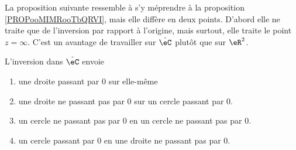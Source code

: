 La proposition suivante ressemble à s'y méprendre à la proposition \ref{PROPooMIMRooTbQRVI}, mais elle diffère en deux points. D'abord elle ne traite que de l'inversion par rapport à l'origine, mais surtout, elle traite le point \( z=\infty\). C'est un avantage de travailler sur \( \hat \eC\) plutôt que sur \( \eR^2\).
\begin{proposition}     \label{PROPooEAKXooUIqWEv}
    L'inversion dans \( \hat \eC\) envoie
    \begin{enumerate}
        \item
            une droite passant par \( 0\) sur elle-même
        \item
            une droite ne passant pas par \( 0\) sur un cercle passant par \( 0\).
        \item
            un cercle ne passant pas par \( 0\) en un cercle ne passant pas par \( 0\).
        \item
            un cercle passant par \( 0\) en une droite ne passant pas par \( 0\).
    \end{enumerate}
\end{proposition}

